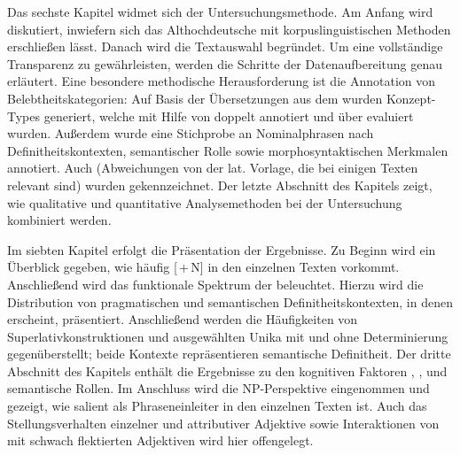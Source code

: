 Das sechste Kapitel widmet sich der Untersuchungsmethode. Am Anfang wird diskutiert, inwiefern sich das Althochdeutsche mit korpuslinguistischen Methoden  erschließen lässt. Danach wird die Textauswahl begründet. Um eine vollständige Transparenz zu gewährleisten, werden die Schritte der Datenaufbereitung genau erläutert. Eine besondere methodische Herausforderung ist die Anno\-ta\-tion  von Belebtheitskategorien:  Auf Basis der Übersetzungen aus dem   wurden Konzept-Types generiert, welche mit Hilfe von  doppelt annotiert  und über   evaluiert wurden. Außerdem wurde eine Stichprobe an Nominalphrasen  nach Definitheitskontexten, semantischer Rolle  sowie morphosyntaktischen Merkmalen  annotiert. Auch  (Abweichungen von der lat. Vorlage, die bei einigen Texten relevant sind) wurden gekennzeichnet. Der letzte Abschnitt des Kapitels zeigt, wie qualitative und quantitative Analysemethoden bei der Untersuchung kombiniert werden. 
  
Im siebten Kapitel erfolgt die Präsentation der Ergebnisse. Zu Beginn wird ein Überblick gegeben, wie häufig [\,+\,N] in den einzelnen Texten vorkommt. Anschließend wird das funktionale Spektrum der  beleuchtet. Hierzu wird die Distribution von pragmatischen  und semantischen Definitheitskontexten,  in denen  erscheint, präsentiert. Anschließend werden die Häufigkeiten von Superlativkonstruktionen  und ausgewählten Unika  mit und ohne Determinierung gegenüberstellt; beide Kontexte repräsentieren semantische Definitheit.  Der dritte Abschnitt des Kapitels enthält die Ergebnisse zu den kognitiven Faktoren , ,  und semantische Rollen. Im Anschluss wird die NP-Perspektive  eingenommen und gezeigt, wie salient  als Phraseneinleiter  in den einzelnen Texten ist. Auch das  Stellungsverhalten  einzelner  und attributiver Adjektive  sowie Interaktionen von  mit schwach flektierten Adjektiven  wird hier offengelegt. 


